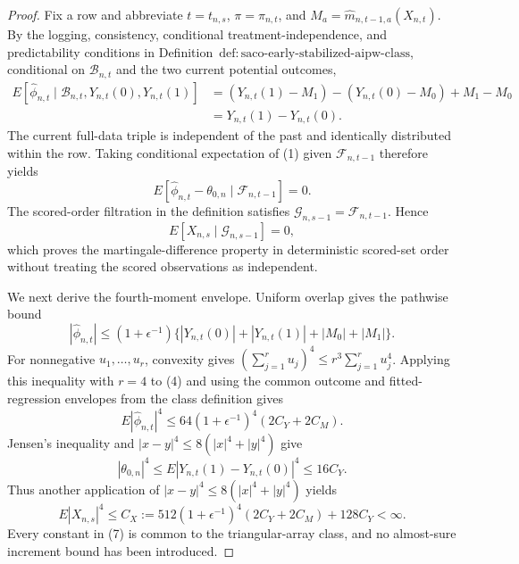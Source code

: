 \documentclass{article}
\begin{document}
\begin{proof}
Fix a row and abbreviate \(t=t_{n,s}\), \(\pi=\pi_{n,t}\), and \(M_a=\widehat m_{n,t-1,a}(X_{n,t})\).  By the logging, consistency, conditional treatment-independence, and predictability conditions in Definition~\(\mathrm{def:saco\text{-}early\text{-}stabilized\text{-}aipw\text{-}class}\), conditional on \(\mathcal B_{n,t}\) and the two current potential outcomes,
\[
\begin{aligned}
E[\widehat\phi_{n,t}\mid\mathcal B_{n,t},Y_{n,t}(0),Y_{n,t}(1)]
&=(Y_{n,t}(1)-M_1)-(Y_{n,t}(0)-M_0)+M_1-M_0\\
&=Y_{n,t}(1)-Y_{n,t}(0).
\end{aligned}
\tag{1}
\]
The current full-data triple is independent of the past and identically distributed within the row.  Taking conditional expectation of (1) given \(\mathcal F_{n,t-1}\) therefore yields
\[
E[\widehat\phi_{n,t}-\theta_{0,n}\mid\mathcal F_{n,t-1}]=0.
\tag{2}
\]
The scored-order filtration in the definition satisfies \(\mathcal G_{n,s-1}=\mathcal F_{n,t-1}\).  Hence
\[
E[X_{n,s}\mid\mathcal G_{n,s-1}]=0,
\tag{3}
\]
which proves the martingale-difference property in deterministic scored-set order without treating the scored observations as independent.

We next derive the fourth-moment envelope.  Uniform overlap gives the pathwise bound
\[
|\widehat\phi_{n,t}|
\le(1+\epsilon^{-1})
\{|Y_{n,t}(0)|+|Y_{n,t}(1)|+|M_0|+|M_1|\}.
\tag{4}
\]
For nonnegative \(u_1,\ldots,u_r\), convexity gives \((\sum_{j=1}^ru_j)^4\le r^3\sum_{j=1}^ru_j^4\).  Applying this inequality with \(r=4\) to (4) and using the common outcome and fitted-regression envelopes from the class definition gives
\[
E|\widehat\phi_{n,t}|^4
\le64(1+\epsilon^{-1})^4(2C_Y+2C_M).
\tag{5}
\]
Jensen's inequality and \(|x-y|^4\le8(|x|^4+|y|^4)\) give
\[
|\theta_{0,n}|^4
\le E|Y_{n,t}(1)-Y_{n,t}(0)|^4
\le16C_Y.
\tag{6}
\]
Thus another application of \(|x-y|^4\le8(|x|^4+|y|^4)\) yields
\[
E|X_{n,s}|^4
\le C_X:=512(1+\epsilon^{-1})^4(2C_Y+2C_M)+128C_Y<\infty.
\tag{7}
\]
Every constant in (7) is common to the triangular-array class, and no almost-sure increment bound has been introduced.


\end{proof}
\end{document}

